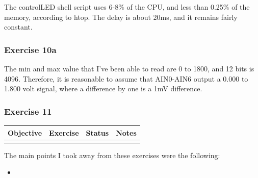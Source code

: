 \documentclass[letterpaper,10pt]{texMemo}
\begin{document}
\newpage


\newpage


\newpage
% 


\noindent The controlLED shell script uses 6-8\% of the CPU, and less than
0.25\% of the memory, according to htop. The delay is about 20ms, and it remains
fairly constant.

\newpage
\subsubsection{Exercise 10a}
\noindent The min and max value that I've been able to read are 0 to 1800,
and 12 bits is 4096. Therefore, it is reasonable to assume that AIN0-AIN6
output a 0.000 to 1.800 volt signal, where a difference by one is a 1mV
difference.



\subsubsection{Exercise 11}

\newpage

\begin{center}
\begin{tabular}{|p{4cm}|l|l|p{8cm}|}
\hline
\textbf{Objective} & \textbf{Exercise} &\textbf{Status} & \textbf{Notes}\\
\hline
& & & \\
\hline
\end{tabular}
\end{center}

\noindent The main points I took away from these exercises were the following:
\begin{itemize}
 \item
\end{itemize}
\end{document}
